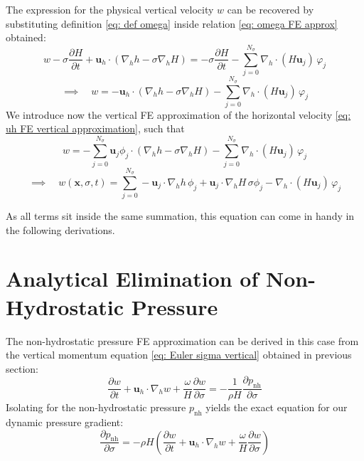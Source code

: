 \documentclass{article}
\newcommand{\Ns}{N_\sigma}
\newcommand{\uh}{\mathbf{u}_h}
\newcommand{\uj}{\mathbf{u}_j}
\newcommand{\sumj}{\sum_{j=0}^{\Ns}}
\newcommand{\nablah}{\nabla_h}
\newcommand{\pnh}{p_{\text{nh}}}
\newcommand{\ddt}[1]{\frac{\partial #1}{\partial t}}
\newcommand{\dds}[1]{\frac{\partial #1}{\partial \sigma}}
\newcommand{\vphij}{\varphi_j}
\begin{document}
The expression for the physical vertical velocity $w$ can be recovered by substituting definition \eqref{eq: def omega} inside relation \eqref{eq: omega FE approx} obtained:
$$w -\sigma \ddt{H} + \uh \cdot \left(\nablah h - \sigma \nablah H \right) = - \sigma \ddt{H} - \sumj\nablah \cdot \left( H \uj\right) \, \vphij$$
$$\implies \quad w  = - \uh \cdot \left(\nablah h - \sigma \nablah H \right) - \sumj\nablah \cdot \left( H \uj\right) \, \vphij$$
We introduce now the vertical FE approximation of the horizontal velocity \eqref{eq: uh FE vertical approximation}, such that
$$w  = - \sumj \uj \phi_j \cdot \left(\nablah h - \sigma \nablah H \right) - \sumj\nablah \cdot \left( H \uj\right) \, \vphij$$
\begin{equation}
    \implies \quad \boxed{w(\mathbf{x}, \sigma,t)  = \sumj -\uj  \cdot \nablah h \,\phi_j + \uj\cdot \nablah H \,\sigma \phi_j -\nablah \cdot \left( H \uj\right) \, \vphij}
    \label{eq: w FE approx}
\end{equation}

As all terms sit inside the same summation, this equation can come in handy in the following derivations.


\section{Analytical Elimination of Non-Hydrostatic Pressure}

The non-hydrostatic pressure FE approximation can be derived in this case from the vertical momentum equation \eqref{eq: Euler sigma vertical} obtained in previous section:
$$\ddt{w} + \uh \cdot \nablah w + \frac{\omega}{H}\dds{w} = -\frac{1}{\rho H}\dds{\pnh}$$
Isolating for the non-hydrostatic pressure $\pnh$ yields the exact equation for our dynamic pressure gradient:
\begin{equation}
    \dds{\pnh} = -\rho H \left(\ddt{w} + \uh \cdot \nablah w + \frac{\omega}{H}\dds{w} \right) 
    \label{eq: nh pressure derivative}
\end{equation}
\end{document}
